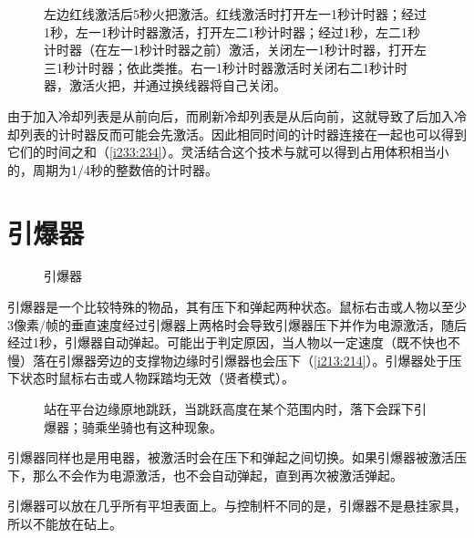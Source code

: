 \begin{figure}[!ht]
\begin{center}
\qquad{}
\end{center}
\caption{左边红线激活后5秒火把激活。红线激活时打开左一1秒计时器；经过1秒，左一1秒计时器激活，打开左二1秒计时器；经过1秒，左二1秒计时器（在左一1秒计时器之前）激活，关闭左一1秒计时器，打开左三1秒计时器；依此类推。右一1秒计时器激活时关闭右二1秒计时器，激活火把，并通过换线器将自己关闭。}
\label{i233:234}
\end{figure}

由于加入冷却列表是从前向后，而刷新冷却列表是从后向前，这就导致了后加入冷却列表的计时器反而可能会先激活。因此相同时间的计时器连接在一起也可以得到它们的时间之和（\autoref{i233:234}）。灵活结合这个技术与就可以得到占用体积相当小的，周期为1/4秒的整数倍的计时器。

\section{引爆器}
\begin{figure}[!ht]
\centering
{}
\caption{引爆器}
\end{figure}
引爆器是一个比较特殊的物品，其有压下和弹起两种状态。鼠标右击或人物以至少3像素/帧的垂直速度经过引爆器上两格时会导致引爆器压下并作为电源激活，随后经过1秒，引爆器自动弹起。可能出于判定原因，当人物以一定速度（既不快也不慢）落在引爆器旁边的支撑物边缘时引爆器也会压下（\autoref{i213:214}）。引爆器处于压下状态时鼠标右击或人物踩踏均无效（贤者模式）。

\begin{figure}[!ht]
\begin{center}
\qquad
{}
\end{center}
\caption{\protect{}站在平台边缘原地跳跃，当跳跃高度在某个范围内时，落下会踩下引爆器；\protect{}骑乘坐骑也有这种现象。}
\label{i213:214}
\end{figure}

引爆器同样也是用电器，被激活时会在压下和弹起之间切换。如果引爆器被激活压下，那么不会作为电源激活，也不会自动弹起，直到再次被激活弹起。

引爆器可以放在几乎所有平坦表面上。与控制杆不同的是，引爆器不是悬挂家具，所以不能放在砧上。

